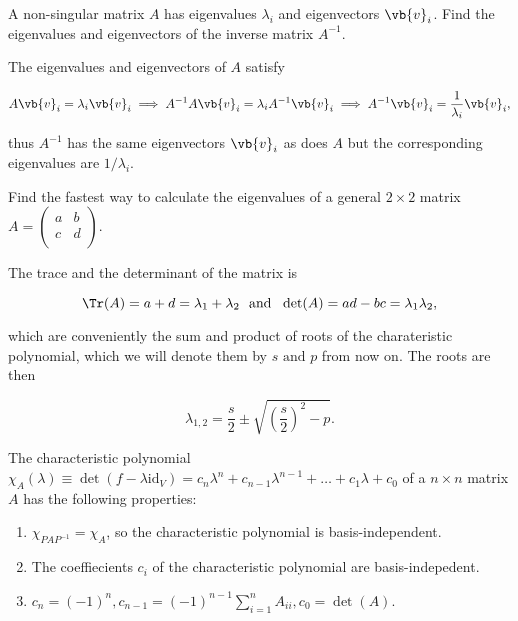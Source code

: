 \documentclass[a4paper,12pt]{report}
\begin{document}
{A non-singular matrix \(A\) has eigenvalues \(\lambda _{i} \) and eigenvectors \(\vb{v} _{i} \). Find the eigenvalues and eigenvectors of the inverse matrix \(A^{-1} \).   }
{The eigenvalues and eigenvectors of \(A\) satisfy

\begin{equation}
    A \vb{v} _{i} = \lambda _{i}\vb{v} _{i} \implies A^{-1} A \vb{v} _{i} = \lambda _{i}A^{-1} \vb{v} _{i} \implies A^{-1} \vb{v} _{i} = \frac{1}{\lambda _{i} }\vb{v} _{i},    
\end{equation}

thus \(A^{-1} \) has the same eigenvectors \(\vb{v} _{i} \) as does \(A\) but the corresponding eigenvalues are \(1 /\lambda _{i} \).   
} 

{Find the fastest way to calculate the eigenvalues of a general \(2 \times 2\) matrix \(A = \begin{pmatrix}
    a &  b \\
    c &  d \\
\end{pmatrix}.\) }
{The trace and the determinant of the matrix is 

\begin{equation}
    \Tr (A) = a+d = \lambda _{1}+\lambda _{2} ~\text { and }~ \det (A) = ad - bc  = \lambda _{1}\lambda _{2},  
\end{equation}

which are conveniently the sum and product of roots of the charateristic polynomial, which we will denote them by \(s \text { and } p\) from now on. The roots are then 

\begin{equation}
    \lambda _{1,2} = \frac{s}{2} \pm \sqrt{\left( \frac{s}{2}  \right)^2 - p }.   
\end{equation}
} 

\begin{lemma}
The characteristic polynomial \(\chi _{A}(\lambda ) \equiv \det (f-\lambda \mathrm{id}_{V} ) = c_{n}\lambda ^{n} + c_{n-1}\lambda ^{n-1} + \ldots + c_1 \lambda +c_0 \) of a \(n \times n\) matrix \(A\) has the following properties:

\begin{enumerate}[label=(\(O\)\arabic*)]
    \item \(\chi _{PAP^{-1} } = \chi _{A}  \), so the characteristic polynomial is basis-independent. \label{O1} 
    \item The coeffiecients \(c_{i} \) of the characteristic polynomial are basis-indepedent.
    \item \(c_{n} = (-1)^{n}, c_{n-1} = (-1)^{n-1}\sum_{i=1}^{n} A_{ii}, c_0 = \det (A)\).    
\end{enumerate}

\end{lemma}
\end{document}
